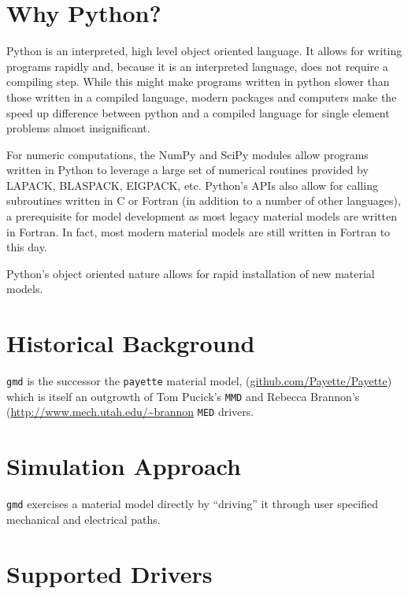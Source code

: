 \documentclass[11pt]{report}
\newcommand{\gmd}{\texttt{gmd}}
\begin{document}
\section{Why Python?}
Python is an interpreted, high level object oriented language. It allows for
writing programs rapidly and, because it is an interpreted language, does not
require a compiling step. While this might make programs written in python
slower than those written in a compiled language, modern packages and
computers make the speed up difference between python and a compiled language
for single element problems almost insignificant.

For numeric computations, the NumPy and SciPy modules allow programs written
in Python to leverage a large set of numerical routines provided by LAPACK,
BLASPACK, EIGPACK, etc. Python's APIs also allow for calling subroutines
written in C or Fortran (in addition to a number of other languages), a
prerequisite for model development as most legacy material models are written
in Fortran. In fact, most modern material models are still written in Fortran
to this day.

Python's object oriented nature allows for rapid installation of new material
models.

\section{Historical Background}
\gmd{} is the successor the \texttt{payette} material model,
(\url{github.com/Payette/Payette}) which is itself an outgrowth of Tom Pucick's
\texttt{MMD} and Rebecca Brannon's (\url{http://www.mech.utah.edu/~brannon}
\texttt{MED} drivers.

\section{Simulation Approach}
\gmd{} exercises a material model directly by ``driving'' it through user
specified mechanical and electrical paths.

\section{Supported Drivers}
\end{document}
